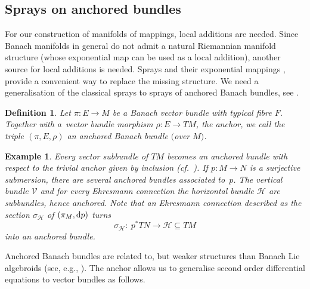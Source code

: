 \documentclass[pdftex]{sigma}
\numberwithin{equation}{section}
\newtheorem{Definition}[Theorem]{Definition}
\newtheorem{Example}[Theorem]{Example}
\newcommand{\cH}{\ensuremath{\mathcal{H}}}
\newcommand{\cV}{\ensuremath{\mathcal{V}}}
\begin{document}
\subsection{Sprays on anchored bundles}
For our construction of manifolds of mappings, local additions are needed. Since Banach manifolds in general do not admit a natural Riemannian manifold structure (whose exponential map can be used as a local addition), another source for local additions is needed. Sprays and their exponential mappings \cite{La01}, provide a convenient way to replace the missing structure. We need a generalisation of the classical sprays to sprays of anchored Banach bundles, see \cite{ana11,CaP12,CaMaS20}.

\begin{Definition}
Let $\pi \colon E \rightarrow M$ be a Banach vector bundle with typical fibre $F$. Together with a~vector bundle morphism $\rho \colon E \rightarrow TM$, the \emph{anchor}, we call the triple $(\pi,E,\rho)$ an \emph{anchored Banach bundle $($over $M)$}.
\end{Definition}

\begin{Example}\label{ex:subbun_anchor}
Every vector subbundle of $TM$ becomes an anchored bundle with respect to the trivial anchor given by inclusion (cf.\ \cite[Example~3.2]{CaP12}).
If $p\colon M \rightarrow N$ is a surjective submersion, there are several anchored bundles associated to~$p$. The vertical bundle $\cV$ and for every Ehresmann connection the horizontal bundle $\cH$ are subbundles, hence anchored. Note that an Ehresmann connection described as the section $\sigma_\cH$ of $(\pi_M,{\rm d}p)$ turns
\begin{displaymath}\sigma_{\cH} \colon\ p^\ast TN \rightarrow \cH \subseteq TM
\end{displaymath}
into an anchored bundle.
\end{Example}

Anchored Banach bundles are related to, but weaker structures than Banach Lie algebroids (see, e.g., \cite{AaGaS20, BaGaP19}). The anchor allows us to generalise second order differential equations to vector bundles as follows.
\end{document}
